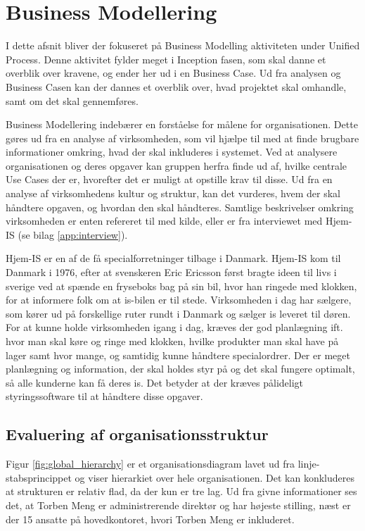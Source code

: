 \chapter{Business Modellering}\label{ch:businessanalysis}
I dette afsnit bliver der fokuseret på Business Modelling aktiviteten under Unified Process\cite{UnifiedProcess}. Denne aktivitet fylder meget i Inception fasen, som skal danne et overblik over kravene, og ender her ud i en Business Case\cite{ProjectManagement}. Ud fra analysen og Business Casen kan der dannes et overblik over, hvad projektet skal omhandle, samt om det skal gennemføres. %

Business Modellering indebærer en forståelse for målene for organisationen. Dette gøres ud fra en analyse af virksomheden, som vil hjælpe til med at finde brugbare informationer omkring, hvad der skal inkluderes i systemet\cite{UP}. Ved at analysere organisationen og deres opgaver kan gruppen herfra finde ud af, hvilke centrale Use Cases der er, hvorefter det er muligt at opstille krav til disse. Ud fra en analyse af virksomhedens kultur og struktur, kan det vurderes, hvem der skal håndtere opgaven, og hvordan den skal håndteres. Samtlige beskrivelser omkring virksomheden er enten refereret til med kilde, eller er fra interviewet med Hjem-IS (se bilag \ref{app:interview}).

Hjem-IS er en af de få specialforretninger tilbage i Danmark. Hjem-IS kom til Danmark i 1976\cite{Hjemisabout}, efter at svenskeren Eric Ericsson først bragte ideen til livs i sverige ved at spænde en fryseboks bag på sin bil, hvor han ringede med klokken, for at informere folk om at is-bilen er til stede\cite{Hjemisabout}. Virksomheden i dag har sælgere, som kører ud på forskellige ruter rundt i Danmark og sælger is leveret til døren. For at kunne holde virksomheden igang i dag, kræves der god planlægning ift. hvor man skal køre og ringe med klokken, hvilke produkter man skal have på lager samt hvor mange, og samtidig kunne håndtere specialordrer. Der er meget planlægning og information, der skal holdes styr på og det skal fungere optimalt, så alle kunderne kan få deres is. Det betyder at der kræves pålideligt styringssoftware til at håndtere disse opgaver. 

\section{Evaluering af organisationsstruktur}
Figur \ref{fig:global_hierarchy} er et organisationsdiagram lavet ud fra linje-stabsprincippet\cite{Organisation} og viser hierarkiet over hele organisationen. Det kan konkluderes at strukturen er relativ flad, da der kun er tre lag. Ud fra givne informationer ses det, at Torben Meng er administrerende direktør og har højeste stilling, næst er der 15 ansatte på hovedkontoret, hvori Torben Meng er inkluderet.

